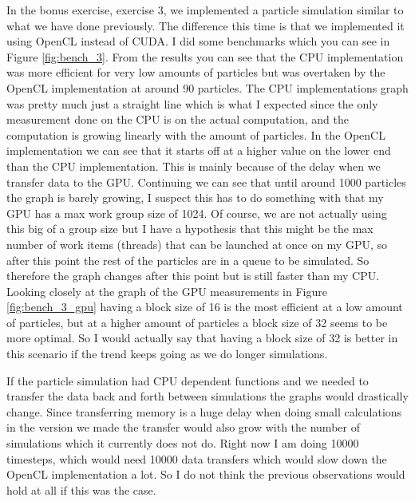\documentclass[a4paper, 12pt]{article}
\def\f#1{Figure \ref{fig:#1}}
\begin{document}
%
%
In the bonus exercise, exercise 3, we implemented a particle simulation similar to what we have done previously. The difference this time is that we implemented it using OpenCL instead of CUDA. I did some benchmarks which you can see in \f{bench_3}. From the results you can see that the CPU implementation was more efficient for very low amounts of particles but was overtaken by the OpenCL implementation at around 90 particles. The CPU implementations graph was pretty much just a straight line which is what I expected since the only measurement done on the CPU is on the actual computation, and the computation is growing linearly with the amount of particles. In the OpenCL implementation we can see that it starts off at a higher value on the lower end than the CPU implementation. This is mainly because of the delay when we transfer data to the GPU. Continuing we can see that until around 1000 particles the graph is barely growing, I suspect this has to do something with that my GPU has a max work group size of 1024. Of course, we are not actually using this big of a group size but I have a hypothesis that this might be the max number of work items (threads) that can be launched at once on my GPU, so after this point the rest of the particles are in a queue to be simulated. So therefore the graph changes after this point but is still faster than my CPU. Looking closely at the graph of the GPU measurements in \f{bench_3_gpu} having a block size of 16 is the most efficient at a low amount of particles, but at a higher amount of particles a block size of 32 seems to be more optimal. So I would actually say that having a block size of 32 is better in this scenario if the trend keeps going as we do longer simulations.

If the particle simulation had CPU dependent functions and we needed to transfer the data back and forth between simulations the graphs would drastically change. Since transferring memory is a huge delay when doing small calculations in the version we made the transfer would also grow with the number of simulations which it currently does not do. Right now I am doing 10000 timesteps, which would need 10000 data transfers which would slow down the OpenCL implementation a lot. So I do not think the previous observations would hold at all if this was the case. 
\end{document}

